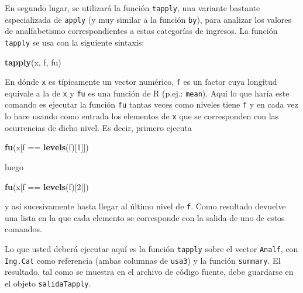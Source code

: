 \documentclass[]{article}
\newenvironment{Shaded}{}{}
\newcommand{\KeywordTok}[1]{\textcolor[rgb]{0.00,0.44,0.13}{\textbf{{#1}}}}
\newcommand{\DecValTok}[1]{\textcolor[rgb]{0.25,0.63,0.44}{{#1}}}
\newcommand{\NormalTok}[1]{{#1}}
\begin{document}
\begin{Shaded}
\end{Shaded}
En segundo lugar, se utilizará la función \texttt{tapply}, una variante
bastante especializada de \texttt{apply} (y muy similar a la función
\texttt{by}), para analizar los valores de analfabetismo
correspondientes a estas categorías de ingresos. La función
\texttt{tapply} se usa con la siguiente sintaxis:

\begin{Shaded}
\begin{Highlighting}[]
\KeywordTok{tapply}\NormalTok{(x, f, fu)}
\end{Highlighting}
\end{Shaded}
En dónde \texttt{x} es típicamente un vector numérico, \texttt{f} es un
factor cuya longitud equivale a la de \texttt{x} y \texttt{fu} es una
función de R (p.ej.: \texttt{mean}). Aquí lo que haría este comando es
ejecutar la función \texttt{fu} tantas veces como niveles tiene
\texttt{f} y en cada vez lo hace usando como entrada los elementos de
\texttt{x} que se corresponden con las ocurrencias de dicho nivel. Es
decir, primero ejecuta

\begin{Shaded}
\begin{Highlighting}[]
\KeywordTok{fu}\NormalTok{(x[f == }\KeywordTok{levels}\NormalTok{(f)[}\DecValTok{1}\NormalTok{]])}
\end{Highlighting}
\end{Shaded}
luego

\begin{Shaded}
\begin{Highlighting}[]
\KeywordTok{fu}\NormalTok{(x[f == }\KeywordTok{levels}\NormalTok{(f)[}\DecValTok{2}\NormalTok{]])}
\end{Highlighting}
\end{Shaded}
y así sucesivamente hasta llegar al último nivel de \texttt{f}. Como
resultado devuelve una lista en la que cada elemento se corresponde
con la salida de uno de estos comandos.

Lo que usted deberá ejecutar aquí es la función \texttt{tapply} sobre el
vector \texttt{Analf}, con \texttt{Ing.Cat} como referencia (ambas
columnas de \texttt{usa3}) y la función \texttt{summary}. El resultado,
tal como se muestra en el archivo de código fuente, debe guardarse en el
objeto \texttt{salidaTapply}.
\end{document}

